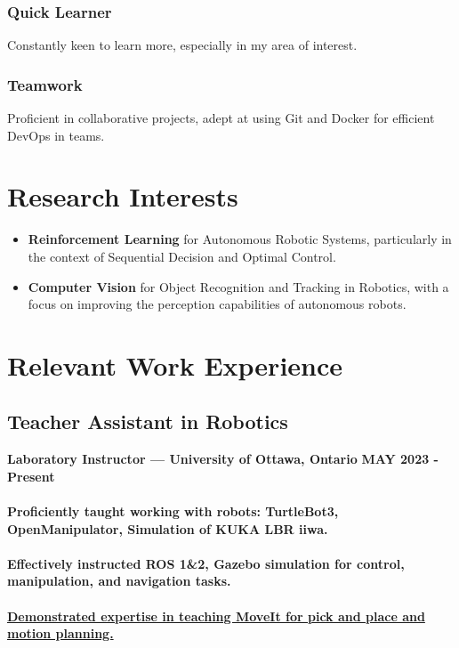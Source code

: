 \documentclass[a4paper]{article}
\begin{document}
\subsubsection{Quick Learner}
Constantly keen to learn more, especially in my area of interest.
    
\subsubsection{Teamwork}
Proficient in collaborative projects, adept at using Git and Docker for efficient DevOps in teams.

\section{Research Interests}

\begin{itemize}
	\itemsep0em 
	\item {\bfseries Reinforcement Learning} for Autonomous Robotic Systems, particularly in the context of Sequential Decision and Optimal Control.
	\item {\bfseries Computer Vision} for Object Recognition and Tracking in Robotics, with a focus on improving the perception capabilities of autonomous robots.
\end{itemize}

\section{Relevant Work Experience}
\subsection{Teacher Assistant in Robotics}
{\bfseries\small Laboratory Instructor — University of Ottawa, Ontario}
\hfill
{\bfseries\small MAY 2023 - Present}

\paragraph{Proficiently taught working with robots: TurtleBot3, OpenManipulator, Simulation of KUKA LBR iiwa.}
\paragraph{Effectively instructed ROS 1\&2, Gazebo simulation for control, manipulation, and navigation tasks.}
\paragraph{\href{https://github.com/ake1999/Robotics_Course_ROS_2023}{Demonstrated expertise in teaching MoveIt for pick and place and motion planning.}}
\end{document}
